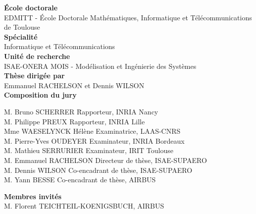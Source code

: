 \documentclass[a4paper,12pt]{article}
\begin{document}
\begin{flushleft}
    \textbf{\large \textbf{École doctorale}} \\
    {\Large EDMITT - École Doctorale Mathématiques, Informatique et Télécommunications de Toulouse} \\[0.5cm]
    
    \textbf{\large \textbf{Spécialité}} \\
    {\Large Informatique et Télécommunications} \\[0.5cm]
    
    \textbf{\large \textbf{Unité de recherche}} \\
    {\Large ISAE-ONERA MOIS - Modélisation et Ingénierie des Systèmes} \\[2cm]
    
    \textbf{\large Thèse dirigée par} \\
    {\Large Emmanuel RACHELSON et Dennis WILSON} \\[2cm]
    
    \textbf{\large Composition du jury} \\
    {\begin{tabbing}
    M. Bruno SCHERRER \hspace{2cm} \= Rapporteur, INRIA Nancy \\
    M. Philippe PREUX \> Rapporteur, INRIA Lille \\
    Mme WAESELYNCK Hélène \> Examinatrice, LAAS-CNRS \\
    M. Pierre-Yves OUDEYER \> Examinateur, INRIA Bordeaux \\
    M. Mathieu SERRURIER \> Examinateur, IRIT Toulouse \\
    M. Emmanuel RACHELSON \> Directeur de thèse, ISAE-SUPAERO \\
    M. Dennis WILSON \> Co-encadrant de thèse, ISAE-SUPAERO \\
    M. Yann BESSE \> Co-encadrant de thèse, AIRBUS
    \end{tabbing}}
    
    \textbf{\large Membres invités} \\
    {\Large M. Florent TEICHTEIL-KOENIGSBUCH, AIRBUS} 
\end{flushleft}
\end{document}
